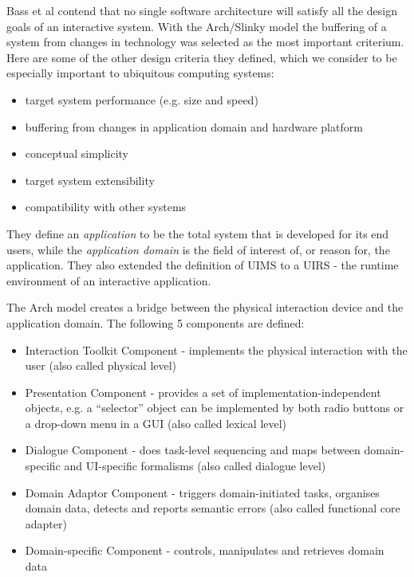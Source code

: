 	Bass et al \cite{Bass1992} contend that no single software architecture will satisfy all the design goals of an interactive system. With the Arch/Slinky model the buffering of a system from changes in technology was selected as the most important criterium. Here are some of the other design criteria they defined, which we consider to be especially important to ubiquitous computing systems:
	
	\begin{itemize}
		\item target system performance (e.g. size and speed)
		\item 	buffering from changes in application domain and hardware platform
		\item 	conceptual simplicity
		\item 	target system extensibility
		\item 	compatibility with other systems
	\end{itemize}
	
	 They define an \emph{application} to be the total system that is developed for its end users, while the \emph{application domain} is the field of interest of, or reason for, the application. They also extended the definition of \ac{UIMS} to a  \ac{UIRS} - the runtime environment of an interactive application.
	
	The Arch model creates a bridge between the physical interaction device and the application domain. The following 5 components are defined:
	
	\begin{itemize}
		\item Interaction Toolkit Component - implements the physical interaction with the user (also called physical level)
		\item Presentation Component - provides a set of im\-ple\-men\-ta\-tion-independent objects, e.g. a ``selector'' object can be implemented by both radio buttons or a drop-down menu in a GUI (also called lexical level)
		\item Dialogue Component - does task-level sequencing and maps between domain-specific and UI-specific formalisms (also called dialogue level)
		\item Domain Adaptor Component - triggers domain-initiated tasks, organises domain data, detects and reports semantic errors (also called functional core adapter)
		\item Domain-specific Component - controls, manipulates and retrieves domain data
	\end{itemize}

